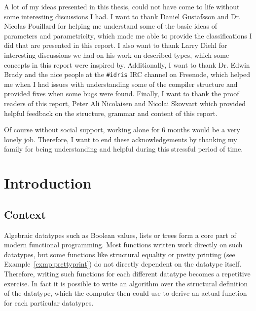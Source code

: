 \documentclass{ituthesis}
\theoremstyle{break}
\begin{document}
A lot of my ideas presented in this thesis, could not have come to life without some interesting discussions I had.
I want to thank Daniel Gustafsson and Dr. Nicolas Pouillard for helping me understand some of the basic ideas of parameters and parametricity, which made me able to provide the classifications I did that are presented in this report.
I also want to thank Larry Diehl for interesting discussions we had on his work on described types, which some concepts in this report were inspired by.
Additionally, I want to thank Dr. Edwin Brady and the nice people at the \texttt{\#idris} IRC channel on Freenode, which helped me when I had issues with understanding some of the compiler structure and provided fixes when some bugs were found.
Finally, I want to thank the proof readers of this report, Peter Ali Nicolaisen and Nicolai Skovvart which provided helpful feedback on the structure, grammar and content of this report.

Of course without social support, working alone for 6 months would be a very lonely job.
Therefore, I want to end these acknowledgements by thanking my family for being understanding and helpful during this stressful period of time.



\cleardoublepage
\setcounter{tocdepth}{1}
\tableofcontents

\mainmatter
\midsloppy
\sloppybottom
\chapter{Introduction}
\label{cha:Intoduction}
\section{Context}
\label{sec:Context}
Algebraic datatypes such as Boolean values, lists or trees form a core part of modern functional programming.
Most functions written work directly on such datatypes, but some functions like structural equality or pretty printing (see Example~\ref{exmp:prettyprint}) do not directly dependent on the datatype itself.
Therefore, writing such functions for each different datatype becomes a repetitive exercise.
In fact it is possible to write an algorithm over the structural definition of the datatype, which the computer then could use to derive an actual function for each particular datatypes.
\end{document}
